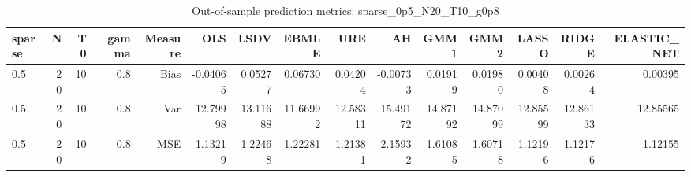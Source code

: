 \begin{table}[!htbp]\centering
\caption{Out-of-sample prediction metrics: sparse_0p5_N20_T10_g0p8}
\label{tab:table3_sparse_0p5_N20_T10_g0p8}
\begin{tabular}{lrrrrrrrrrrrrrr}
\hline
sparse & N & T0 & gamma & Measure & OLS & LSDV & EBMLE & URE & AH & GMM1 & GMM2 & LASSO & RIDGE & ELASTIC_NET \\
\hline
0.5 & 20 & 10 & 0.8 & Bias & -0.04065 & 0.05277 & 0.06730 & 0.04204 & -0.00733 & 0.01919 & 0.01980 & 0.00408 & 0.00264 & 0.00395 \\
0.5 & 20 & 10 & 0.8 & Var & 12.79998 & 13.11688 & 11.66992 & 12.58311 & 15.49172 & 14.87192 & 14.87099 & 12.85599 & 12.86133 & 12.85565 \\
0.5 & 20 & 10 & 0.8 & MSE & 1.13219 & 1.22468 & 1.22281 & 1.21381 & 2.15932 & 1.61085 & 1.60718 & 1.12196 & 1.12176 & 1.12155 \\
\hline
\end{tabular}
\end{table}

